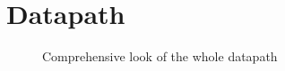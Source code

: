 \chapter{Datapath}

\begin{figure}[h]
	\noindent
	\caption{Comprehensive look of the whole datapath}
	\label{dp_fig}
\end{figure}







